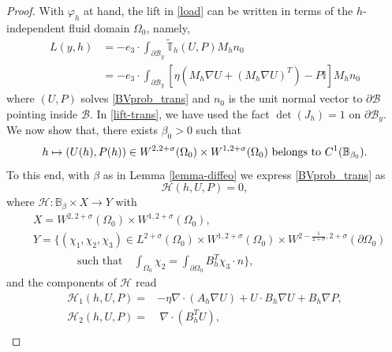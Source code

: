 \documentclass[10pt,a4paper]{amsart}
\begin{document}
\begin{proof}
With $\varphi_h$ at hand,   the lift in \eqref{load}
can be written in terms of the $h$-independent fluid domain $\Omega_0$, namely,
    \begin{equation} \label{lift-trans}\begin{aligned}
        L(y,h)&=-e_3\cdot \int_{\partial \mathcal{B}_y}\widetilde{\mathbb{T}}_h(U, P) M_hn_0\\&=-e_3 \cdot \int_{\partial \mathcal{B}_y}  \left[\eta (M_h \nabla U + (M_h\nabla U)^T) - P\mathbb{I}\right] M_hn_0
        \end{aligned}
    \end{equation}
where $(U,P)$ solves \eqref{BVprob_trans} and $n_0$ is the  unit normal vector to $\partial \mathcal{B}$ pointing inside $\mathcal{B}$. In \eqref{lift-trans}, we have used the fact $\det(J_h)=1$ on $\partial \mathcal{B}_y$. We now show that, there exists $\beta_0>0$ such that
\begin{equation}\label{claim}\vspace{0.1em}
h\mapsto (U(h),P(h))\in W^{2, 2+\sigma}(\Omega_0) \times W^{1, 2+\sigma}(\Omega_0)\mbox{ belongs to }  C^1(\mathbb{B}_{\beta_0}).\vspace{0.1em}
\end{equation}
 To this end, with $\beta$ as in Lemma \ref{lemma-diffeo} we express \eqref{BVprob_trans} as
\begin{equation}\label{implicit}
\mathcal{H}(h,U, P)=0,
\end{equation}where  $\mathcal{H} :  \mathbb{B}_\beta\times  X \rightarrow Y$  with
\begin{equation*}\begin{aligned}
&X=W^{2, 2+\sigma}(\Omega_0)\times W^{1, 2+\sigma}(\Omega_0),\\
&Y=\bigg\{(\chi_1,\chi_2,\chi_3)\in L^{2+\sigma}(\Omega_0)\times W^{1, 2+\sigma}(\Omega_0)\times W^{2-\tfrac{1}{2+\sigma}, 2+\sigma}(\partial \Omega_0)  \\
&\qquad \qquad  \text{such that} \quad \int_{\Omega_0} \chi_2 = \int_{\partial \Omega_0}B_h^T \chi_3 \cdot n \bigg\}, \end{aligned}\end{equation*} and the components of $\mathcal{H}$ read
\begin{equation}\label{defH}
	\begin{aligned}
	\mathcal{H}_1(h, U, P)= &-\eta\nabla \cdot (A_h\nabla U) + U \cdot B_h\nabla U + B_h \nabla P,\\[5pt]
	\mathcal{H}_2(h, U, P)= & \ \nabla \cdot (B_h^T U), \\[5pt]

\end{aligned}
\end{equation}
\end{proof}
\end{document}
